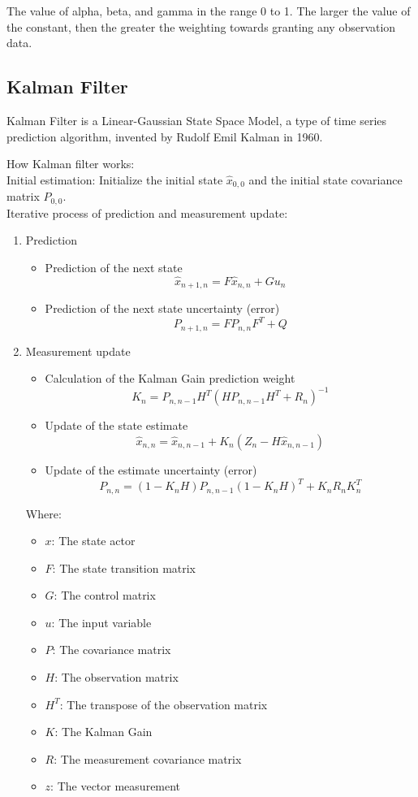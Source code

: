 \documentclass[conference]{IEEEtran}
\begin{document}
The value of alpha, beta, and gamma in the range 0 to 1. The larger the value of the constant, then the greater the weighting towards granting any observation data.
\subsection{Kalman Filter}

Kalman Filter is a Linear-Gaussian State Space Model, a type of time series prediction algorithm, invented by Rudolf Emil Kalman in 1960.\cite{b4}

How Kalman filter works: \\
Initial estimation: Initialize the initial state $\widehat{x}_{0,0}$ and the initial state covariance matrix $P_{0,0}$.\\
Iterative process of prediction and measurement update:

\begin{enumerate}
    \item Prediction
    \begin{itemize}
        \item Prediction of the next state
        \[ \widehat{x}_{n + 1, n} = F\widehat{x}_{n, n} + Gu_{n} \]
        \item Prediction of the next state uncertainty (error)
        \[ P_{n + 1, n} = FP_{n, n}F^{T} + Q \]
    \end{itemize}
    \item Measurement update
    \begin{itemize}
        \item Calculation of the Kalman Gain prediction weight
        \[ K_{n} = P_{n, n - 1}H^{T}(HP_{n, n - 1}H^{T} + R_{n})^{-1} \]
        \item Update of the state estimate
        \[ \widehat{x}_{n, n} = \widehat{x}_{n, n - 1} + K_{n}(Z_{n} - H\widehat{x}_{n, n - 1}) \]
        \item Update of the estimate uncertainty (error)
        \[ P_{n, n} = (1 - K_{n}H)P_{n, n - 1}(1 - K_{n}H)^{T} + K_{n}R_{n}K_{n}^{T} \]
    \end{itemize}

Where:
    \begin{itemize}
        \item $x$: The state actor
        \item $F$: The state transition matrix
        \item $G$: The control matrix
        \item $u$: The input variable
        \item $P$: The covariance matrix
        \item $H$: The observation matrix
        \item ${H}^{T}$: The transpose of the observation matrix
        \item $K$: The Kalman Gain
        \item $R$: The measurement covariance matrix
        \item $z$: The vector measurement
    \end{itemize}
\end{enumerate}
\end{document}
